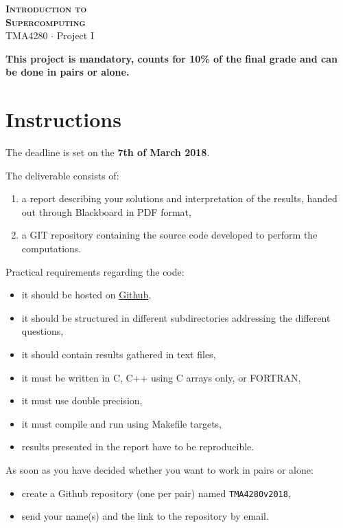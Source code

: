 \documentclass[onecolumn, oneside, a4paper, 11pt]{memoir}
\theoremstyle{remark}
\begin{document}
\pagestyle{empty}

\begin{center}
  {\Huge \bfseries \scshape
    Introduction to \\[0.2\baselineskip] Supercomputing} \\[2\baselineskip]
  {\Large TMA4280 $\cdot$ Project I} \\[2\baselineskip]
\end{center}

\textbf{This project is mandatory, counts for 10\% of the final grade and can be done in pairs or alone.}

\section*{Instructions}

The deadline is set on the \textbf{7th of March 2018}.

\medskip
The deliverable consists of:
\begin{enumerate}
\item a report describing your solutions and interpretation of the results, handed out through Blackboard in PDF format,
\item a GIT repository containing the source code developed to perform the computations.
\end{enumerate}

\bigskip
Practical requirements regarding the code:
\begin{itemize}
\item it should be hosted on \href{https://github.com/}{Github},
\item it should be structured in different subdirectories addressing the different questions,
\item it should contain results gathered in text files,
\item it must be written in C, C++ using C arrays only, or FORTRAN,
\item it must use double precision,
\item it must compile and run using Makefile targets,
\item results presented in the report have to be reproducible.
\end{itemize}

\bigskip
As soon as you have decided whether you want to work in pairs or alone:
\begin{itemize}
\item create a Github repository (one per pair) named \texttt{TMA4280v2018},
\item send your name(s) and the link to the repository by email.
\end{itemize}
\end{document}
